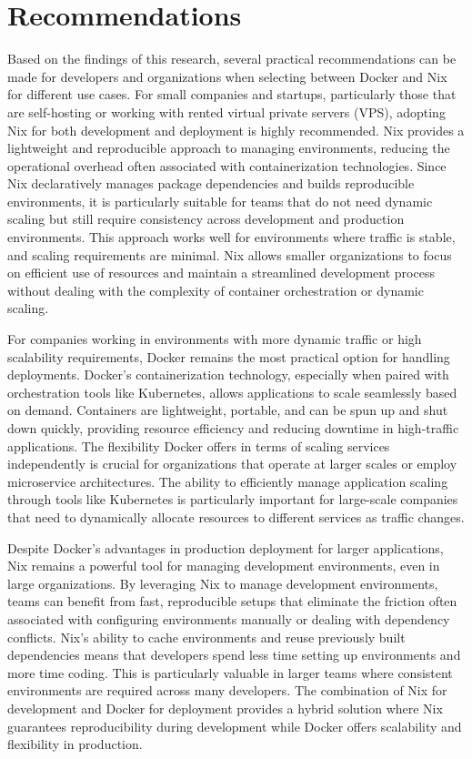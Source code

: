 \section{Recommendations}
Based on the findings of this research, several practical recommendations can be made
for developers and organizations when selecting between Docker and Nix for different
use cases. For small companies and startups, particularly those that are self-hosting
or working with rented virtual private servers (VPS), adopting Nix for both development
and deployment is highly recommended. Nix provides a lightweight and reproducible
approach to managing environments, reducing the operational overhead often associated
with containerization technologies. Since Nix declaratively manages package dependencies
and builds reproducible environments, it is particularly suitable for teams that do not
need dynamic scaling but still require consistency across development and production
environments. This approach works well for environments where traffic is stable, and
scaling requirements are minimal. Nix allows smaller organizations to focus on efficient
use of resources and maintain a streamlined development process without dealing with the
complexity of container orchestration or dynamic scaling.

For companies working in environments with more dynamic traffic or high scalability
requirements, Docker remains the most practical option for handling deployments. Docker’s
containerization technology, especially when paired with orchestration tools like
Kubernetes, allows applications to scale seamlessly based on demand. Containers
are lightweight, portable, and can be spun up and shut down quickly, providing
resource efficiency and reducing downtime in high-traffic applications. The flexibility
Docker offers in terms of scaling services independently is crucial for organizations
that operate at larger scales or employ microservice architectures. The ability to
efficiently manage application scaling through tools like Kubernetes is particularly
important for large-scale companies that need to dynamically allocate resources to
different services as traffic changes.

Despite Docker’s advantages in production deployment for larger applications, Nix
remains a powerful tool for managing development environments, even in large
organizations. By leveraging Nix to manage development environments, teams can
benefit from fast, reproducible setups that eliminate the friction often associated
with configuring environments manually or dealing with dependency conflicts. Nix’s
ability to cache environments and reuse previously built dependencies means that
developers spend less time setting up environments and more time coding. This is
particularly valuable in larger teams where consistent environments are required
across many developers. The combination of Nix for development and Docker for deployment
provides a hybrid solution where Nix guarantees reproducibility during development
while Docker offers scalability and flexibility in production.

